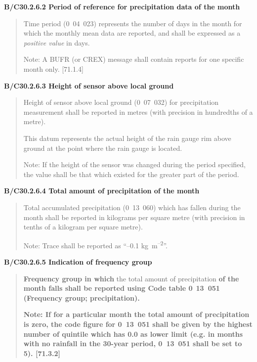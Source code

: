 \textbf{B/C30.2.6.2 Period of reference for precipitation data of the month}

\begin{quote}
Time period (0~04~023) represents the number of days in the month for which the monthly mean data are reported, and shall be expressed as a \emph{positive value} in days.

Note: A BUFR (or CREX) message shall contain reports for one specific month only. {[}71.1.4{]}
\end{quote}

\textbf{B/C30.2.6.3 Height of sensor above local ground}

\begin{quote}
Height of sensor above local ground (0~07~032) for precipitation measurement shall be reported in metres (with precision in hundredths of a metre).

This datum represents the actual height of the rain gauge rim above ground at the point where the rain gauge is located.

Note: If the height of the sensor was changed during the period specified, the value shall be that which existed for the greater part of the period.
\end{quote}

\textbf{B/C30.2.6.4 Total amount of precipitation of the month}

\begin{quote}
Total accumulated precipitation (0~13~060) which has fallen during the month shall be reported in kilograms per square metre (with precision in tenths of a kilogram per square metre).

Note: Trace shall be reported as ``--0.1 kg~m\textsuperscript{--2}''.
\end{quote}

\textbf{B/C30.2.6.5 Indication of frequency group}

\begin{quote}
\textbf{Frequency group in which} the total amount of precipitation \textbf{of the month falls shall be reported using Code table 0}~\textbf{13~051 (Frequency group; precipitation).}

\textbf{Note: If for a particular month the total amount of precipitation is zero, the code figure for 0~13~051 shall be given by the highest number of quintile which has 0.0 as lower limit (e.g. in months with no rainfall in the 30-year period, 0~13~051 shall be set to 5). {[}71.3.2{]}}
\end{quote}

